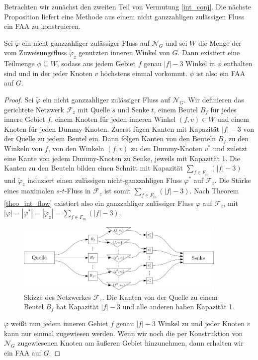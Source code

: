 Betrachten wir zunächst den zweiten Teil von Vermutung \ref{int_conj}. Die nächste Proposition liefert eine Methode aus einem nicht ganzzahligen zulässigen Fluss ein FAA zu konstruieren.

\begin{proposition}\label{lem_faa}
Sei $\tilde{\varphi}$ ein nicht ganzzahliger zulässiger Fluss auf $\mathcal{N}_G$ und sei $W$ die Menge der vom Zuweisungsfluss $\tilde{\varphi}_z$ genutzten inneren Winkel von $G$. Dann existiert eine Teilmenge $\phi\subseteq W$, sodass aus jedem Gebiet $f$ genau $|f|-3$ Winkel in $\phi$ enthalten sind und in der jeder Knoten $v$ höchstens einmal vorkommt. $\phi$ ist also ein FAA auf $G$.
\end{proposition}

\begin{proof}
Sei $\tilde{\varphi}$ ein nicht ganzzahliger zulässiger Fluss auf $\mathcal{N}_G$. Wir definieren das gerichtete Netzwerk $\mathcal{F}_z$ mit Quelle $s$ und Senke $t$, einem Beutel $B_f$ für jedes innere Gebiet $f$, einem Knoten für jeden inneren Winkel $(f,v) \in W$ und einem Knoten für jeden Dummy-Knoten. Zuerst fügen Kanten mit Kapazität $|f|-3$ von der Quelle zu jedem Beutel ein. Dann folgen Kanten von den Beuteln $B_f$ zu den Winkeln von $f$, von den Winkeln $(f,v)$ zu den Dummy-Knoten $v^*$ und zuletzt eine Kante von jedem Dummy-Knoten zu Senke, jeweils mit Kapazität 1. Die Kanten zu den Beuteln bilden einen Schnitt mit Kapazität $\sum_{f \in F_{in}}(|f|-3)$ und $\tilde{\varphi}_z$ induziert einen zulässigen nicht-ganzzahligen Fluss $\varphi^*$ auf $\mathcal{F}_z$. Die Stärke eines maximalen $s$-$t$-Fluss in $\mathcal{F}_z$ ist somit $\sum_{f \in F_{in}}(|f|-3)$. Nach Theorem \ref{theo_int_flow} existiert also ein ganzzahliger zulässiger Fluss $\varphi$ auf $\mathcal{F}_z$, mit $|\varphi| = |\varphi^*| = |\tilde{\varphi}_z| = \sum_{f \in F_{in}}(|f|-3).$

\begin{figure}
	\centering
  	\includegraphics[width=0.9\textwidth]{lem_faa_choice.png}
  	\caption{Skizze des Netzwerkes $\mathcal{F}_z$. Die Kanten von der Quelle zu einem Beutel $B_f$ hat Kapazität $|f|-3$ und alle anderen haben Kapazität 1.}
	\label{pic_faa_choice}
\end{figure}

$\varphi$ weißt nun jedem inneren Gebiet $f$ genau $|f|-3$ Winkel zu und jeder Knoten $v$ kann nur einmal zugewiesen werden. Wenn wir noch die per Konstruktion von $\mathcal{N}_G$ zugewiesenen Knoten am äußeren Gebiet hinzunehmen, dann erhalten wir ein FAA auf $G$.
\end{proof}

